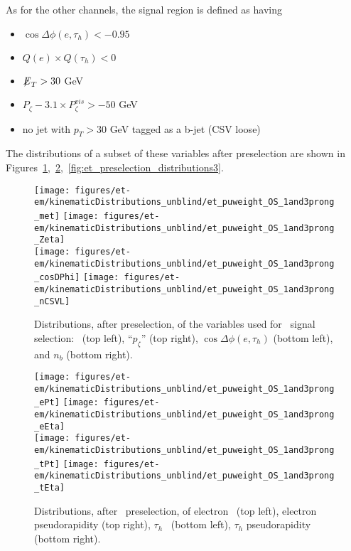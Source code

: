 As for the other channels, the signal region is defined as having
\begin{itemize}
  \item $\cos{\Delta \phi (e,\tau_{h})}<-0.95$
  \item $Q(e) \times Q(\tau_{h}) < 0 $
  \item ${\not\mathrel{E}}_T>30$ GeV
  \item $P_{\zeta}- 3.1 \times P_{\zeta}^{vis} > -50$ GeV
  \item no jet with $p_T>30$ GeV tagged as a b-jet (CSV loose)
\end{itemize}

The distributions of a subset of these variables after preselection are shown in
Figures~\ref{fig:et_preselection_distributions1},~\ref{fig:et_preselection_distributions2},~\ref{fig:et_preselection_distributions3}.

\begin{figure}[thbp!]\centering
  \texttt{[image: figures/et-em/kinematicDistributions\_unblind/et\_puweight\_OS\_1and3prong\_met]}
  \texttt{[image: figures/et-em/kinematicDistributions\_unblind/et\_puweight\_OS\_1and3prong\_Zeta]} \\
  \texttt{[image: figures/et-em/kinematicDistributions\_unblind/et\_puweight\_OS\_1and3prong\_cosDPhi]}
  \texttt{[image: figures/et-em/kinematicDistributions\_unblind/et\_puweight\_OS\_1and3prong\_nCSVL]}
  \caption{\label{fig:et_preselection_distributions1} Distributions,
    after preselection, of the variables used for \teth ~signal
    selection: \ETslash ~(top left), ``$p_\zeta$'' (top right),
    $\cos{\Delta \phi (e,\tau_{h})}$ (bottom left), and $n_b$ (bottom
    right).}
\end{figure}

\begin{figure}[thbp!]\centering
  \texttt{[image: figures/et-em/kinematicDistributions\_unblind/et\_puweight\_OS\_1and3prong\_ePt]}
  \texttt{[image: figures/et-em/kinematicDistributions\_unblind/et\_puweight\_OS\_1and3prong\_eEta]} \\
  \texttt{[image: figures/et-em/kinematicDistributions\_unblind/et\_puweight\_OS\_1and3prong\_tPt]}
  \texttt{[image: figures/et-em/kinematicDistributions\_unblind/et\_puweight\_OS\_1and3prong\_tEta]}
  \caption{\label{fig:et_preselection_distributions2} Distributions,
    after \teth ~preselection, of electron \pt ~(top left), electron
    pseudorapidity (top right), $\tau_h$ \pt ~(bottom left), $\tau_h$
    pseudorapidity (bottom right).}
\end{figure}

